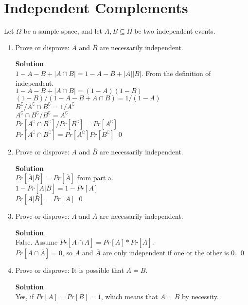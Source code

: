 \documentclass[11pt]{article}
\newcommand*{\Question}[1]{\section{#1}}
\newenvironment{Parts}{\begin{enumerate}[label=(\alph*)]}{\end{enumerate}}
\newcommand*{\Part}{\item}
\begin{document}
\Question{Independent Complements}

Let $\Omega$ be a sample space, and let $A,B \subseteq \Omega$ be two independent events.

\begin{Parts}

\Part Prove or disprove: $\overline{A}$ and $\overline{B}$ are necessarily independent.
\begin{mdframed} \textbf{Solution} \\
$1-A-B+|A \cap B|=1-A-B+|A||B|$. From the definition of independent. \\
$1-A-B+|A \cap B|=(1-A)(1-B)$ \\
$(1-B)/(1-A-B+A \cap B)=1/(1-A)$ \\
$B^\complement/A^\complement \cap B^\complement=1/A^\complement$ \\
$A^\complement \cap B^\complement / B^\complement=A^\complement$ \\
$Pr[A^\complement \cap B^\complement]/Pr[B^\complement]=Pr[A^\complement]$ \\
$Pr[A^\complement \cap B^\complement]=Pr[A^\complement]Pr[B^\complement]$ \qed
\end{mdframed}

\Part Prove or disprove: $A$ and $\overline{B}$ are necessarily independent.
\begin{mdframed} \textbf{Solution} \\
$Pr[\overline{A}|\overline{B}]=Pr[\overline{A}]$ from part a. \\
$1-Pr[A|\overline{B}]=1-Pr[A]$ \\
$Pr[A|\overline{B}]=Pr[A]$ \qed
\end{mdframed}

\Part Prove or disprove: $A$ and $\overline{A}$ are necessarily independent.
\begin{mdframed} \textbf{Solution} \\
False. Assume $Pr[A \cap \overline{A}]=Pr[A]*Pr[\overline{A}]$. \\
$Pr[A \cap \overline{A}]=0$, so $A$ and $\overline{A}$ are only independent if one or the other is 0. \qed 
\end{mdframed}

\Part Prove or disprove: It is possible that $A=B$.
\begin{mdframed} \textbf{Solution} \\
Yes, if $Pr[A]=Pr[B]=1$, which means that $A=B$ by necessity. 
\end{mdframed}

\end{Parts}
\end{document}
